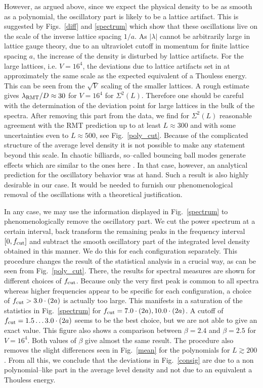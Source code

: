 However, as argued above, since we expect the physical density to be
as smooth as a polynomial, the oscillatory part is likely to be a
lattice artifact. This is suggested by Figs.~\ref{diff} and
\ref{spectrum} which show that these oscillations live on the scale of
the inverse lattice spacing $1/a$. As $|\lambda|$ cannot be
arbitrarily large in lattice gauge theory, due to an ultraviolet
cutoff in momentum for finite lattice spacing $a$, the increase of the
density is disturbed by lattice artifacts.  For the large lattices,
i.e.  $V=16^4$, the deviations due to lattice artifacts set in at
approximately the same scale as the expected equivalent of a Thouless
energy. This can be seen from the $\sqrt{V}$ scaling of the smaller
lattices. A rough estimate gives $\lambda_{\rm RMT}/D\approx30$ for
$V=16^4$ for $\Sigma^2(L)$.  Therefore one should be careful with the
determination of the deviation point for large lattices in the bulk of
the spectra.  After removing this part from the data, we find for
$\Sigma^2(L)$ reasonable agreement with the RMT prediction up to at
least $L\approx300$ and with some uncertainties even to $L\approx500$,
see Fig.~\ref{poly_cut}.  Because of the complicated structure of the
average level density it is not possible to make any statement beyond
this scale.  In chaotic billiards, so--called bouncing ball modes
generate effects which are similar to the ones here \cite{graef92}.
In that case, however, an analytical prediction for the oscillatory
behavior was at hand. Such a result is also highly desirable in our
case.  It would be needed to furnish our phenomenological removal of
the oscillations with a theoretical justification.

In any case, we may use the information displayed in
Fig.~\ref{spectrum} to phenomenologically remove the oscillatory part.
We cut the power spectrum at a certain interval, back transform the
remaining peaks in the frequency interval $[0,f_{\rm cut}]$ and
subtract the smooth oscillatory part of the integrated level density
obtained in this manner.  We do this for each configuration
separately.  This procedure changes the result of the statistical
analysis in a crucial way, as can be seen from Fig.~\ref{poly_cut}.
There, the results for spectral measures are shown for different
choices of $f_{\rm cut}$.  Because only the very first peak is common
to all spectra whereas higher frequencies appear to be specific for
each configuration, a choice of $f_{\rm cut}>3.0\cdot(2a)$ is actually
too large. This manifests in a saturation of the statistics in
Fig.~\ref{spectrum} for $f_{\rm cut}=7.0\cdot(2a),10.0\cdot(2a)$.  A
cutoff of $f_{\rm cut}=1.5\ldots3.0\cdot(2a)$ seems to be the best
choice, but we are not able to give an exact value.  This figure also
shows a comparison between $\beta=2.4$ and $\beta=2.5$ for $V=16^4$.
Both values of $\beta$ give almost the same result.  The procedure
also removes the slight differences seen in Fig.~\ref{mean} for the
polynomials for $L\gtrsim200$. From all this, we conclude that the
deviations in Fig.~\ref{consig} are due to a non polynomial--like part
in the average level density and not due to an equivalent a Thouless
energy.  

